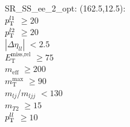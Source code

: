 SR\_SS\_ee\_2\_opt: (162.5,12.5): \\
$p_{\text{T}}^{l1}$ $\geq 20$ \\
$p_{\text{T}}^{l2}$ $\geq 20$ \\
$|\Delta\eta_{ll}|$ $<2.5$ \\
$E_{\text{T}}^{\text{miss,rel}}$ $\geq 75$ \\
$m_{\text{eff}}$ $\geq 200$ \\
$m_{\text{T}}^{\text{max}}$ $\geq 90$ \\
$m_{lj}$/$m_{ljj}$ $<130$ \\
$m_{T2}$ $\geq 15$ \\
$p_{\text{T}}^{ll}$ $\geq 10$ \\
